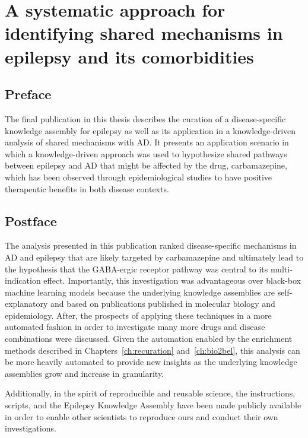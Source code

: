 \chapter{A systematic approach for identifying shared mechanisms in epilepsy and its comorbidities}
\label{ch:epicom}

\section*{Preface}

The final publication in this thesis describes the curation of a disease-specific knowledge assembly for epilepsy as well as its application in a knowledge-driven analysis of shared mechanisms with \ac{AD}.
It presents an application scenario in which a knowledge-driven approach was used to hypothesize shared pathways between epilepsy and \ac{AD} that might be affected by the drug, carbamazepine, which has been observed through epidemiological studies to have positive therapeutic benefits in both disease contexts.

\vspace*{\fill}



\section*{Postface}

The analysis presented in this publication ranked disease-specific mechanisms in \ac{AD} and epilepsy that are likely targeted by carbamazepine and ultimately lead to the hypothesis that the GABA-ergic receptor pathway was central to its multi-indication effect.
Importantly, this investigation was advantageous over black-box machine learning models because the underlying knowledge assemblies are self-explanatory and based on publications published in molecular biology and epidemiology.
After, the prospects of applying these techniques in a more automated fashion in order to investigate many more drugs and disease combinations were discussed.
Given the automation enabled by the enrichment methods described in Chapters~\ref{ch:recuration} and~\ref{ch:bio2bel}, this analysis can be more heavily automated to provide new insights as the underlying knowledge assemblies grow and increase in granularity.

Additionally, in the spirit of reproducible and reusable science, the instructions, scripts, and the Epilepsy Knowledge Assembly have been made publicly available in order to enable other scientists to reproduce ours and conduct their own investigations.

